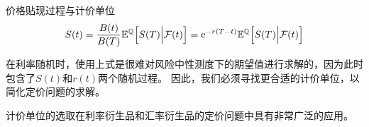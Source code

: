 \documentclass[t]{beamer}
\newcommand{\EQ}{\mathbb{E}^{\mathbb{Q}}}
\begin{document}
\begin{frame}{价格贴现过程与计价单位}
	\[S(t)=\frac{B(t)}{B(T)}\EQ\Big[S(T)\Big|\mathcal{F}(t)\Big]={\rm e}^{-r(T-t)}\EQ\Big[S(T)\Big|\mathcal{F}(t)\Big]\]

	在利率随机时，使用上式是很难对风险中性测度下的期望值进行求解的，因为此时包含了$S(t)$和$r(t)$两个随机过程。
因此，我们必须寻找更合适的计价单位，以简化定价问题的求解。

计价单位的选取在利率衍生品和汇率衍生品的定价问题中具有非常广泛的应用。
\end{frame}
\end{document}
